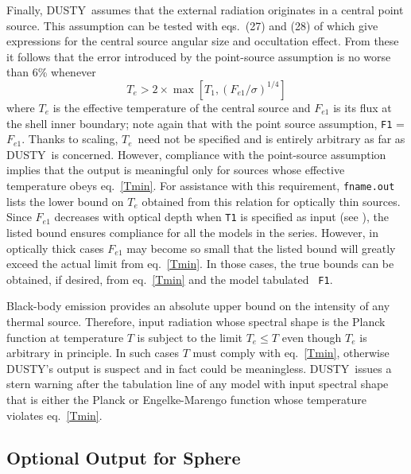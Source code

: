 \documentclass[11pt]{article}
\def\D    {{\sf DUSTY}}
\def\eq#1{\begin{equation} #1 \end{equation}}
\def\Te   {\hbox{$T_e$}}
\begin{document}
Finally, \D\ assumes that the external radiation originates in a central point
source. This assumption can be tested with eqs.\ (27) and (28) of \cite{IE97}
which give expressions for the central source angular size and occultation
effect. From these it follows that the error introduced by the point-source
assumption is no worse than 6\% whenever \eq{\label{Tmin} T_e >
2\times\max[T_1, (F_{e1}/\sigma)^{1/4}]} where $T_e$ is the effective
temperature of the central source and $F_{e1}$ is its flux at the shell inner
boundary; note again that with the point source assumption, {\tt F1} =
$F_{e1}$. Thanks to scaling, \Te\ need not be specified and is entirely
arbitrary as far as \D\ is concerned. However, compliance with the
point-source assumption implies that the output is meaningful only for sources
whose effective temperature obeys eq.\ \ref{Tmin}. For assistance with this
requirement, {\tt fname.out} lists the lower bound on $T_e$ obtained from this
relation for optically thin sources. Since $F_{e1}$ decreases with optical
depth when {\tt T1} is specified as input (see \cite{IE97}), the listed bound
ensures compliance for all the models in the series. However, in optically
thick cases $F_{e1}$ may become so small that the listed bound will greatly
exceed the actual limit from eq.\ \ref{Tmin}. In those cases, the true bounds
can be obtained, if desired, from eq.\ \ref{Tmin} and the model tabulated {\tt
F1}.

Black-body emission provides an absolute upper bound on the intensity
of any thermal source. Therefore, input radiation whose spectral shape
is the Planck function at temperature $T$ is subject to the limit $T_e
\le T$ even though $T_e$ is arbitrary in principle. In such cases $T$
must comply with eq.\ \ref{Tmin}, otherwise \D's output is suspect and
in fact could be meaningless.  \D\ issues a stern warning after the
tabulation line of any model with input spectral shape that is either
the Planck or Engelke-Marengo function whose temperature violates eq.\
\ref{Tmin}.



\subsection{Optional Output for Sphere}
\label{sec:optional_sph}
\end{document}
